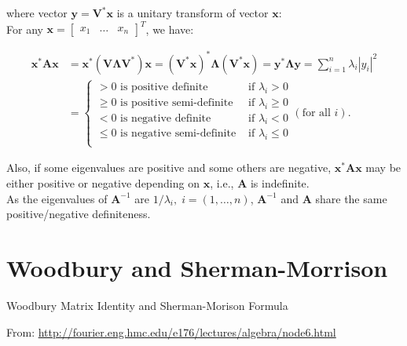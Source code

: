 \documentclass[10pt,b5paper,titlepage]{book}
\begin{document}
where vector $\mathbf{y} = \mathbf{V}^{*}\mathbf{x}$ is a unitary transform of
vector $\mathbf{x}$:\\

For any $\mathbf{x} = \begin{bmatrix} x_1 & \ldots & x_n \end{bmatrix}^{T}$, we have:

\begin{equation}
    \begin{array}{ll}
        \mathbf{x}^{*}\mathbf{A}\mathbf{x}
        &= \mathbf{x}^{*}(\mathbf{V}\mathbf{\Lambda}\mathbf{V}^{*})\mathbf{x}
        = (\mathbf{V}^{*}\mathbf{x})^{*}\mathbf{\Lambda}(\mathbf{V}^{*}\mathbf{x})
        = \mathbf{y}^{*}\mathbf{\Lambda}\mathbf{y}
        = \sum_{i=1}^{n} \lambda_{i} |y_{i}|^{2}\\
        &= \left\{\begin{array}{lr}
                > 0 \text{ is positive definite} & \text{ if } \lambda_{i} > 0\\
                \ge 0 \text{ is positive semi-definite} & \text{ if } \lambda_{i} \ge 0\\
                < 0 \text{ is negative definite} & \text{ if } \lambda_{i} < 0\\
                \le 0 \text{ is negative semi-definite} & \text{ if } \lambda_{i} \le 0\\
        \end{array}  \right. (\text{for all } i).
    \end{array}
\end{equation}

Also, if some eigenvalues are positive and some others are negative,
$\mathbf{x}^{*}\mathbf{A}\mathbf{x}$ may be either positive or negative depending
on $\mathbf{x}$, i.e., $\mathbf{A}$ is indefinite.\\

As the eigenvalues of $\mathbf{A}^{-1}$ are $1 / \lambda_{i}, \; i = (1, \ldots, n)$,
$\mathbf{A}^{-1}$ and $\mathbf{A}$ share the same positive/negative definiteness.



\chapter{Woodbury and Sherman-Morrison}

Woodbury Matrix Identity and Sherman-Morison Formula

From: \url{http://fourier.eng.hmc.edu/e176/lectures/algebra/node6.html}\\
\end{document}
